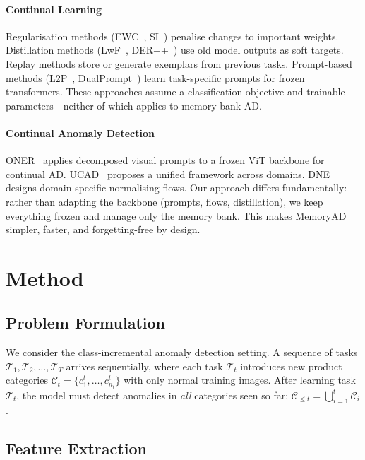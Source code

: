 \documentclass[conference]{IEEEtran}
\newcommand{\method}{MemoryAD}
\begin{document}
\paragraph{Continual Learning}
Regularisation methods (EWC~\cite{kirkpatrick2017ewc}, SI~\cite{zenke2017si}) penalise changes to important weights. Distillation methods (LwF~\cite{li2017lwf}, DER++~\cite{buzzega2020dark}) use old model outputs as soft targets. Replay methods store or generate exemplars from previous tasks. Prompt-based methods (L2P~\cite{wang2022l2p}, DualPrompt~\cite{wang2022dualprompt}) learn task-specific prompts for frozen transformers. These approaches assume a classification objective and trainable parameters---neither of which applies to memory-bank AD.

\paragraph{Continual Anomaly Detection}
ONER~\cite{oner2024} applies decomposed visual prompts to a frozen ViT backbone for continual AD. UCAD~\cite{liu2024ucad} proposes a unified framework across domains. DNE~\cite{li2024dne} designs domain-specific normalising flows. Our approach differs fundamentally: rather than adapting the backbone (prompts, flows, distillation), we keep everything frozen and manage only the memory bank. This makes \method{} simpler, faster, and forgetting-free by design.

\section{Method}

\subsection{Problem Formulation}

We consider the class-incremental anomaly detection setting. A sequence of tasks $\mathcal{T}_1, \mathcal{T}_2, \ldots, \mathcal{T}_T$ arrives sequentially, where each task $\mathcal{T}_t$ introduces new product categories $\mathcal{C}_t = \{c_1^t, \ldots, c_{n_t}^t\}$ with only normal training images. After learning task $\mathcal{T}_t$, the model must detect anomalies in \emph{all} categories seen so far: $\mathcal{C}_{\leq t} = \bigcup_{i=1}^{t} \mathcal{C}_i$.

\subsection{Feature Extraction}
\end{document}
